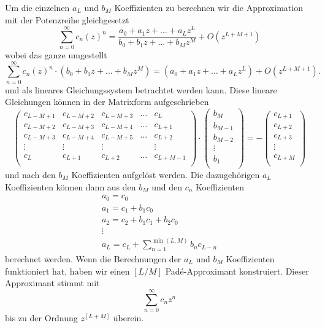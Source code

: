 Um die einzelnen $a_L$ und $b_M$ Koeffizienten zu berechnen wir die Approximation mit der Potenzreihe gleichgesetzt
\begin{equation}
\sum_{n=0}^{\infty} c_{n} (z)^{n} 
=
\frac{a_0 + a_1 z + \dots + a_L z^L}{b_0 + b_1 z + \dots + b_M z^M}
+O(z^{L+M+1})
\end{equation}
wobei das ganze umgestellt
\begin{equation}
\sum_{n=0}^{\infty} c_{n} (z)^{n} 
\cdot
(b_0 + b_1 z + \dots + b_M z^M)
=
(a_0 + a_1 z + \dots + a_L z^L) 
+
O(z^{L+M+1}).
\end{equation}
und als lineares Gleichungssystem betrachtet werden kann.
Diese lineare Gleichungen können in der Matrixform aufgeschrieben
\[
\renewcommand\arraystretch{1.25}
\begin{pmatrix}
c_{L-M+1} & c_{L-M+2} & c_{L-M+3} &\dots & c_{L}\\
c_{L-M+2} & c_{L-M+3} & c_{L-M+4} &\dots & c_{L+1}\\
c_{L-M+3} & c_{L-M+4} & c_{L-M+5} &\dots & c_{L+2}\\
\vdots & \vdots  & \vdots  &  & \vdots \\
c_{L} & c_{L+1} & c_{L+2} &\dots & c_{L+M-1}\\
\end{pmatrix}
\cdot
\begin{pmatrix}
b_{M}\\
b_{M-1}\\
b_{M-2}\\
\vdots \\
b_{1}\\
\end{pmatrix}
=
-
\begin{pmatrix}
c_{L+1}\\
c_{L+2}\\
c_{L+3}\\
\vdots \\
c_{L+M}\\
\end{pmatrix}
\label{pade:bKoeff}
\]
und nach den $b_M$ Koeffizienten aufgelöst werden.
Die dazugehörigen $a_L$ Koeffizienten können dann aus den $b_M$ und den $c_n$ Koeffizienten 
\begin{equation}
\begin{array}{l}
a_{0}=c_{0} \\
a_{1}=c_{1}+b_{1} c_{0} \\
a_{2}=c_{2}+b_{1} c_{1}+b_{2} c_{0} \\
\vdots \\
a_{L}=c_{L}+\displaystyle\sum_{n=1}^{\min (L, M)} b_{n} c_{L-n}
\end{array}
\label{pade:aKoeff}
\end{equation}
berechnet werden.
Wenn die Berechnungen der $a_L$ und $b_M$ Koeffizienten funktioniert hat, haben wir einen $[L/M]$ Padé-Approximant konstruiert.
Dieser Approximant stimmt mit 
\begin{equation}
\sum_{n=0}^{\infty} c_{n} z^{n}
\end{equation}
bis zu der Ordnung $z^{[L+M]}$ überein.

